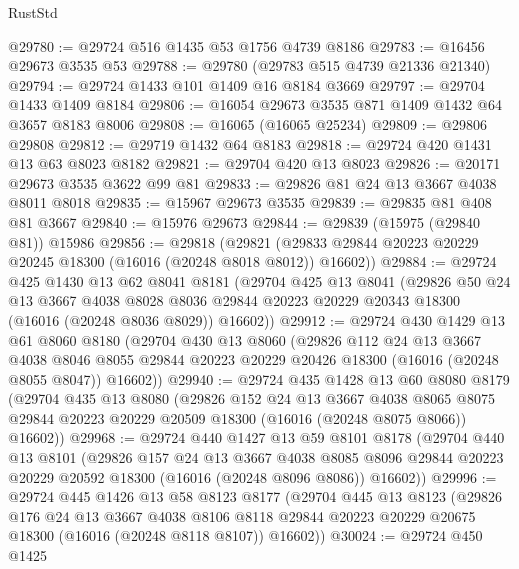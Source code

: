 \begin{lexlean}{RustStd}
\begin{coremodule}
@29780 := @29724 @516 @1435 @53 @1756 @4739 @8186
@29783 := @16456 @29673 @3535 @53
@29788 := @29780 (@29783 @515 @4739 @21336 @21340)
@29794 := @29724 @1433 @101 @1409 @16 @8184 @3669
@29797 := @29704 @1433 @1409 @8184
@29806 := @16054 @29673 @3535 @871 @1409 @1432 @64 @3657 @8183 @8006
@29808 := @16065 (@16065 @25234)
@29809 := @29806 @29808
@29812 := @29719 @1432 @64 @8183
@29818 := @29724 @420 @1431 @13 @63 @8023 @8182
@29821 := @29704 @420 @13 @8023
@29826 := @20171 @29673 @3535 @3622 @99 @81
@29833 := @29826 @81 @24 @13 @3667 @4038 @8011 @8018
@29835 := @15967 @29673 @3535
@29839 := @29835 @81 @408 @81 @3667
@29840 := @15976 @29673
@29844 := @29839 (@15975 (@29840 @81)) @15986
@29856 := @29818
    (@29821 (@29833 @29844 @20223 @20229 @20245 @18300 (@16016 (@20248 @8018 @8012)) @16602))
@29884 := @29724
    @425
    @1430
    @13
    @62
    @8041
    @8181
    (@29704
      @425
      @13
      @8041
      (@29826
        @50
        @24
        @13
        @3667
        @4038
        @8028
        @8036
        @29844
        @20223
        @20229
        @20343
        @18300
        (@16016 (@20248 @8036 @8029))
        @16602))
@29912 := @29724
    @430
    @1429
    @13
    @61
    @8060
    @8180
    (@29704
      @430
      @13
      @8060
      (@29826
        @112
        @24
        @13
        @3667
        @4038
        @8046
        @8055
        @29844
        @20223
        @20229
        @20426
        @18300
        (@16016 (@20248 @8055 @8047))
        @16602))
@29940 := @29724
    @435
    @1428
    @13
    @60
    @8080
    @8179
    (@29704
      @435
      @13
      @8080
      (@29826
        @152
        @24
        @13
        @3667
        @4038
        @8065
        @8075
        @29844
        @20223
        @20229
        @20509
        @18300
        (@16016 (@20248 @8075 @8066))
        @16602))
@29968 := @29724
    @440
    @1427
    @13
    @59
    @8101
    @8178
    (@29704
      @440
      @13
      @8101
      (@29826
        @157
        @24
        @13
        @3667
        @4038
        @8085
        @8096
        @29844
        @20223
        @20229
        @20592
        @18300
        (@16016 (@20248 @8096 @8086))
        @16602))
@29996 := @29724
    @445
    @1426
    @13
    @58
    @8123
    @8177
    (@29704
      @445
      @13
      @8123
      (@29826
        @176
        @24
        @13
        @3667
        @4038
        @8106
        @8118
        @29844
        @20223
        @20229
        @20675
        @18300
        (@16016 (@20248 @8118 @8107))
        @16602))
@30024 := @29724
    @450
    @1425

\end{coremodule}
\end{lexlean}
